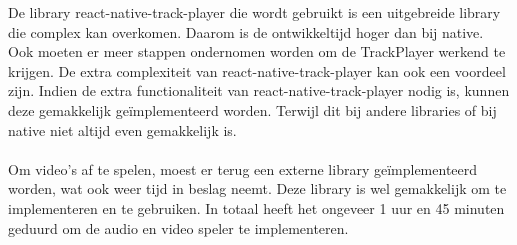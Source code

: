 De library react-native-track-player die wordt gebruikt is een uitgebreide library
die complex kan overkomen. Daarom is de ontwikkeltijd hoger dan bij native.
Ook moeten er meer stappen ondernomen worden om de TrackPlayer werkend te krijgen.
De extra complexiteit van react-native-track-player kan ook een voordeel zijn. Indien de
extra functionaliteit van react-native-track-player nodig is, kunnen deze gemakkelijk geïmplementeerd worden.
Terwijl dit bij andere libraries of bij native niet altijd even gemakkelijk is.
\\\\
Om video's af te spelen, moest er terug een externe library geïmplementeerd worden, wat ook weer
tijd in beslag neemt. Deze library is wel gemakkelijk om te implementeren en te gebruiken.
In totaal heeft het ongeveer 1 uur en 45 minuten geduurd om de audio en video speler te implementeren.

